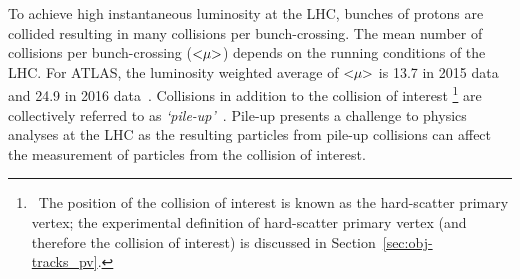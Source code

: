 
To achieve high instantaneous luminosity at the LHC, bunches of protons are collided resulting in many collisions per bunch-crossing.
The mean number of collisions per bunch-crossing ($<\hspace{-3pt}\mu\hspace{-3pt}>$) depends on the running conditions of the LHC.
For ATLAS, the luminosity weighted average of $<\hspace{-3pt}\mu\hspace{-3pt}>$ is 13.7 in 2015 data and 24.9 in 2016 data~\cite{det-ATLAS_lumi_twiki}.
Collisions in addition to the collision of interest
\footnote{\ The position of the collision of interest is known as the hard-scatter primary vertex;
  the experimental definition of hard-scatter primary vertex (and therefore the collision of interest) is discussed in Section~\ref{sec:obj-tracks_pv}.}
are collectively referred to as \textit{`pile-up'}~\cite{det-pileup}.
Pile-up presents a challenge to physics analyses at the LHC
as the resulting particles from pile-up collisions can affect the measurement of particles from the collision of interest.

